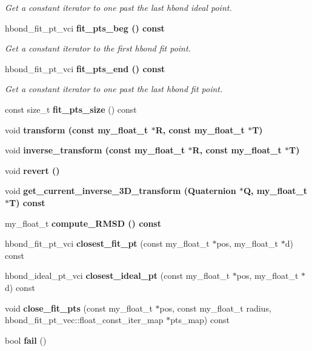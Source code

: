 \begin{CompactItemize}
\begin{CompactList}\small\item\em Get a constant iterator to one past the last hbond ideal point. \item\end{CompactList}\item 
hbond\_\-fit\_\-pt\_\-vci \bf{fit\_\-pts\_\-beg} () const \label{classSimSite3D_1_1HbondPoints_9bdd5a0296d972353e432b010b7964dd}

\begin{CompactList}\small\item\em Get a constant iterator to the first hbond fit point. \item\end{CompactList}\item 
hbond\_\-fit\_\-pt\_\-vci \bf{fit\_\-pts\_\-end} () const \label{classSimSite3D_1_1HbondPoints_2b5bf1df8a99b0f1b933526cca817e86}

\begin{CompactList}\small\item\em Get a constant iterator to one past the last hbond fit point. \item\end{CompactList}\item 
const size\_\-t \textbf{fit\_\-pts\_\-size} () const \label{classSimSite3D_1_1HbondPoints_0d26e83f90943a2e13158647cd11d0c7}

\item 
void \bf{transform} (const my\_\-float\_\-t $\ast$R, const my\_\-float\_\-t $\ast$T)
\item 
void \bf{inverse\_\-transform} (const my\_\-float\_\-t $\ast$R, const my\_\-float\_\-t $\ast$T)
\item 
void \bf{revert} ()
\item 
void \bf{get\_\-current\_\-inverse\_\-3D\_\-transform} (Quaternion $\ast$Q, my\_\-float\_\-t $\ast$T) const 
\item 
my\_\-float\_\-t \bf{compute\_\-RMSD} () const 
\item 
hbond\_\-fit\_\-pt\_\-vci \textbf{closest\_\-fit\_\-pt} (const my\_\-float\_\-t $\ast$pos, my\_\-float\_\-t $\ast$d) const \label{classSimSite3D_1_1HbondPoints_6ed493e533d9b4d58040452835edc0bf}

\item 
hbond\_\-ideal\_\-pt\_\-vci \textbf{closest\_\-ideal\_\-pt} (const my\_\-float\_\-t $\ast$pos, my\_\-float\_\-t $\ast$d) const \label{classSimSite3D_1_1HbondPoints_bb868c3415537bf4201293ed155f8de6}

\item 
void \textbf{close\_\-fit\_\-pts} (const my\_\-float\_\-t $\ast$pos, const my\_\-float\_\-t radius, hbond\_\-fit\_\-pt\_\-vec::float\_\-const\_\-iter\_\-map $\ast$pts\_\-map) const \label{classSimSite3D_1_1HbondPoints_199ab61731d64ddbc1f1693dc27b5b58}

\item 
bool \textbf{fail} ()\label{classSimSite3D_1_1HbondPoints_693b4ff8920d1fb4245f10bcc2210c36}

\end{CompactItemize}
